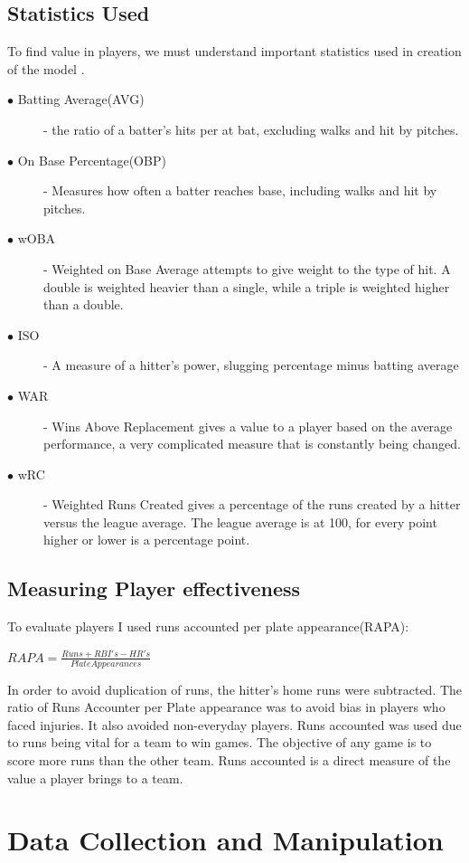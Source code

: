 \documentclass[12pt]{article}
\begin{document}
\subsection{Statistics Used}
\qquad To find value in players, we must understand important statistics used in creation of the model \cite{fangraphs}.
 \begin{description}
  \item[$\bullet$ Batting Average(AVG)] - the ratio of a batter's hits per at bat, excluding walks and hit by pitches.
  \item[$\bullet$ On Base Percentage(OBP)]  - Measures how often a batter reaches base, including walks and hit by pitches. 
  \item[$\bullet$ wOBA]  - Weighted on Base Average attempts to give weight to the type of hit. A double is weighted heavier than a single, while a triple is weighted higher than a double.
  \item[$\bullet$ ISO]  - A measure of a hitter's power, slugging percentage minus batting average
  \item[$\bullet$ WAR]  - Wins Above Replacement gives a value to a player based on the average performance, a very complicated measure that is constantly being changed.
  \item[$\bullet$ wRC]  - Weighted Runs Created gives a percentage of the runs created by a hitter versus the league average. The league average is at 100, for every point higher or lower is a percentage point. 
\end{description}

\subsection{Measuring Player effectiveness}
\qquad To evaluate players I used runs accounted per plate appearance(RAPA):
\begin{center}
$RAPA = \frac{Runs + RBI's - HR's}{Plate Appearances}$
\end{center}
In order to avoid duplication of runs, the hitter's home runs were subtracted. The ratio of Runs Accounter per Plate appearance was to avoid bias in players who faced injuries. It also avoided non-everyday players. Runs accounted was used due to runs being vital for a team to win games. The objective of any game is to score more runs than the other team. Runs accounted is a direct measure of the value a player brings to a team.

\section{Data Collection and Manipulation}
\end{document}
